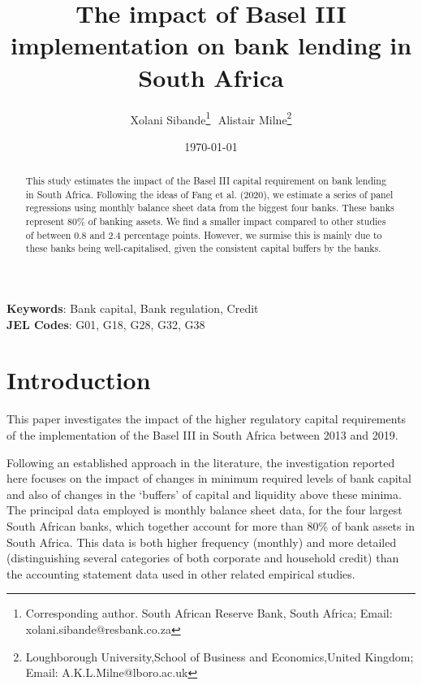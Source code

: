\documentclass[
  12,
]{article}
\author{}
\date{\vspace{-2.5em}}
\begin{document}
\title{The impact of Basel III implementation on bank lending in South Africa}


\author{ 
Xolani Sibande\footnote{Corresponding author. South African Reserve Bank, South Africa; Email: xolani.sibande@resbank.co.za}\,\,
Alistair Milne\footnote{Loughborough University,School of Business and Economics,United Kingdom; Email: A.K.L.Milne@lboro.ac.uk} 
}
\date{\today}
\maketitle

\begin{abstract}
This study estimates the impact of the Basel III capital requirement on bank lending in South Africa. Following the ideas of Fang et al. (2020), we estimate a series of panel regressions using monthly balance sheet data from the biggest four banks. These banks represent 80\% of banking assets. We find a smaller impact compared to other studies of between 0.8 and 2.4 percentage points. However, we surmise this is mainly due to these banks being well-capitalised, given the consistent capital buffers by the banks. 

\end{abstract}

\noindent\textbf{Keywords}: Bank capital, Bank regulation, Credit   \\
\textbf{JEL Codes}: G01, G18, G28, G32, G38
\newpage

\hypertarget{introduction}{%
\section{Introduction}\label{introduction}}

This paper investigates the impact of the higher regulatory capital requirements of the implementation of the Basel III in South Africa between 2013 and 2019.

Following an established approach in the literature, the investigation reported here focuses on the impact of changes in minimum required levels of bank capital and also of changes in the `buffers' of capital and liquidity above these minima. The principal data employed is monthly balance sheet data, for the four largest South African banks, which together account for more than 80\% of bank assets in South Africa. This data is both higher frequency (monthly) and more detailed (distinguishing several categories of both corporate and household credit) than the accounting statement data used in other related empirical studies.
\end{document}
